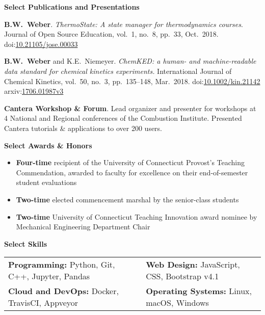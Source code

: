 \documentclass[11pt]{article}
\newcommand{\cvsection}[1]
{
\begin{center}
    \large\textcolor{sectcol}{\textbf{#1}}
\end{center}
}
\newenvironment{cvevent}[3]{%
%
\begin{tabular*}{1\textwidth}{p{13.9cm} x{3.04cm}}%
    \textbf{#2} - \textcolor{bgcol}{#3} & \vspace{2.5pt}\textcolor{sectcol}{#1}%
\end{tabular*}%

\vspace{-8pt}%
\textcolor{softcol}{\hrule}%
\vspace{6pt}%
}{
\vspace{6pt}
}
\newcommand*{\meauthor}[1]{\textbf{#1}}
\newcommand*{\papertitle}[1]{\textit{#1}}
\newcommand{\iconspace}{\enspace}
\newcommand{\arxiv}[1]{\aiarXiv\iconspace arxiv:\href{https://arxiv.org/abs/#1}{#1}}
\newcommand{\doi}[1]{\aiDoi\iconspace doi:\href{https://doi.org/#1}{#1}}
\begin{document}

\vspace{-10pt}

\cvsection{Select Publications and Presentations}

\meauthor{B.W.\ Weber}. \papertitle{ThermoState: A state manager for thermodynamics
courses}. Journal of Open Source Education, vol.\ 1, no.\ 8, pp.\ 33,
Oct.\ 2018.
\doi{10.21105/jose.00033}

\meauthor{B.W.\ Weber} and K.E.\ Niemeyer. \papertitle{ChemKED: a human- and
machine-readable data standard for chemical kinetics experiments.} International Journal
of Chemical Kinetics, vol.\ 50, no.\ 3, pp.\ 135--148, Mar.\ 2018.
\doi{10.1002/kin.21142} \quad \arxiv{1706.01987v3}

\textbf{Cantera Workshop \& Forum}. Lead organizer and presenter for workshops at 4
National and Regional conferences of the Combustion Institute. Presented Cantera tutorials
\& applications to over 200 users.


\cvsection{Select Awards \& Honors}

\begin{itemize}[leftmargin=*]
    \item \textbf{Four-time} recipient of the University of Connecticut Provost's Teaching
    Commendation, awarded to faculty for excellence on their end-of-semester student evaluations
    \item \textbf{Two-time} elected commencement marshal by the senior-class students
    \item \textbf{Two-time} University of Connecticut Teaching Innovation award nominee by
    Mechanical Engineering Department Chair
\end{itemize}

\vspace{-15pt}

\cvsection{Select Skills}

\begin{tabular}{ll}
\textbf{Programming:} Python, Git, C++, Jupyter, Pandas & \textbf{Web Design:} JavaScript, CSS, Bootstrap v4.1 \\
\textbf{Cloud and DevOps:} Docker, TravisCI, Appveyor &
\textbf{Operating Systems:} Linux, macOS, Windows
\end{tabular}
\end{document}
